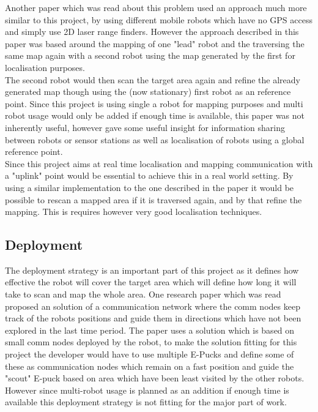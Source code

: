 Another paper which was read about this problem used an approach much more similar to this project, by using different mobile robots which have no GPS access and simply use 2D laser range finders. However the approach described in this paper was based around the mapping of one "lead" robot and the traversing the same map again with a second robot using the map generated by the first for localisation purposes.\\
The second robot would then scan the target area again and refine the already generated map though using the (now stationary) first robot as an reference point. Since this project is using single a robot for mapping purposes and multi robot usage would only be added if enough time is available, this paper was not inherently useful, however gave some useful insight for information sharing between robots or sensor stations as well as localisation of robots using a global reference point.\\
Since this project aims at real time localisation and mapping communication with a "uplink" point would be essential to achieve this in a real world setting. By using a similar implementation to the one described in the paper it would be possible to rescan a mapped area if it is traversed again, and by that refine the mapping. This is requires however very good localisation techniques.

\subsection{Deployment}
The deployment strategy is an important part of this project as it defines how effective the robot will cover the target area which will define how long it will take to scan and map the whole area. 
One research paper which was read proposed an solution of a communication network where the comm nodes keep track of the robots positions and guide them in directions which have not been explored in the last time period\cite{Batalin2003Coverage}. The paper uses a solution which is based on small comm nodes deployed by the robot, to make the solution fitting for this project the developer would have to use multiple E-Pucks and define some of these as communication nodes which remain on a fast position and guide the "scout" E-puck based on area which have been least visited by the other robots.\\ 
However since multi-robot usage is planned as an addition if enough time is available this deployment strategy is not fitting for the major part of work.

